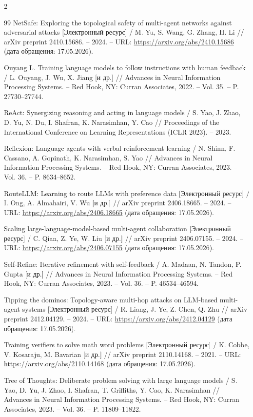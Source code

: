 \begin{multicols}{2}
\begin{thebibliography}{99}
NetSafe: Exploring the topological safety of multi-agent
networks against adversarial attacks [Электронный ресурс]
/ M. Yu, S. Wang, G. Zhang, H. Li // arXiv preprint 2410.15686.
-- 2024.
-- URL: \url{https://arxiv.org/abs/2410.15686} (дата обращения: 17.05.2026).

Ouyang L. Training language models to follow instructions with
human feedback / L. Ouyang, J. Wu, X. Jiang [и др.]
// Advances in Neural Information Processing Systems. -- Red
Hook, NY: Curran Associates, 2022. -- Vol. 35.
-- P. 27730--27744.

ReAct: Synergizing reasoning and acting in language models
/ S. Yao, J. Zhao, D. Yu, N. Du, I. Shafran, K. Narasimhan,
Y. Cao // Proceedings of the International Conference on
Learning Representations (ICLR 2023). -- 2023.

Reflexion: Language agents with verbal reinforcement learning
/ N. Shinn, F. Cassano, A. Gopinath, K. Narasimhan, S. Yao
// Advances in Neural Information Processing Systems. -- Red
Hook, NY: Curran Associates, 2023. -- Vol. 36.
-- P. 8634--8652.

RouteLLM: Learning to route LLMs with preference data
[Электронный ресурс] / I. Ong, A. Almahairi, V. Wu [и др.]
// arXiv preprint 2406.18665. -- 2024.
-- URL: \url{https://arxiv.org/abs/2406.18665} (дата обращения: 17.05.2026).

Scaling large-language-model-based multi-agent collaboration
[Электронный ресурс] / C. Qian, Z. Ye, W. Liu [и др.]
// arXiv preprint 2406.07155. -- 2024.
-- URL: \url{https://arxiv.org/abs/2406.07155} (дата обращения: 17.05.2026).

Self-Refine: Iterative refinement with self-feedback / A. Madaan,
N. Tandon, P. Gupta [и др.] // Advances in Neural Information
Processing Systems. -- Red Hook, NY: Curran Associates, 2023.
-- Vol. 36. -- P. 46534--46594.

Tipping the dominos: Topology-aware multi-hop attacks on
LLM-based multi-agent systems [Электронный ресурс] / R. Liang,
J. Ye, Z. Chen, Q. Zhu // arXiv preprint 2412.04129. -- 2024.
-- URL: \url{https://arxiv.org/abs/2412.04129} (дата обращения: 17.05.2026).

Training verifiers to solve math word problems [Электронный
ресурс] / K. Cobbe, V. Kosaraju, M. Bavarian [и др.]
// arXiv preprint 2110.14168. -- 2021.
-- URL: \url{https://arxiv.org/abs/2110.14168} (дата обращения: 17.05.2026).

Tree of Thoughts: Deliberate problem solving with large language
models / S. Yao, D. Yu, J. Zhao, I. Shafran, T. Griffiths, Y. Cao,
K. Narasimhan // Advances in Neural Information Processing
Systems. -- Red Hook, NY: Curran Associates, 2023. -- Vol. 36.
-- P. 11809--11822.

\end{thebibliography}
\end{multicols}
\endgroup
